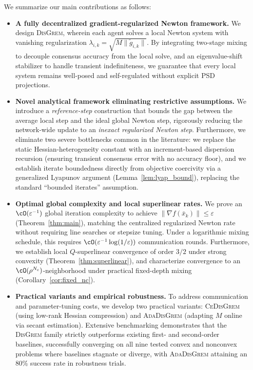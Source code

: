 \documentclass[review,onefignum,onetabnum]{siamart171218}
\begin{document}
We summarize our main contributions as follows:
\begin{itemize}[leftmargin=1.5em]
	\item \textbf{A fully decentralized gradient-regularized Newton framework.} We design \textsc{DisGrem}, wherein each agent solves a local Newton system with vanishing regularization $\lambda_{i,k}=\sqrt{M\|\tilde g_{i,k}\|}$. By integrating two-stage mixing to decouple consensus accuracy from the local solve, and an eigenvalue-shift stabilizer to handle transient indefiniteness, we guarantee that every local system remains well-posed and self-regulated without explicit PSD projections.
	
	\item \textbf{Novel analytical framework eliminating restrictive assumptions.} We introduce a \emph{reference-step} construction that bounds the gap between the average local step and the ideal global Newton step, rigorously reducing the network-wide update to an \emph{inexact regularized Newton step}. Furthermore, we eliminate two severe bottlenecks common in the literature: we replace the static Hessian-heterogeneity constant with an increment-based dispersion recursion (ensuring transient consensus error with no accuracy floor), and we establish iterate boundedness directly from objective coercivity via a generalized Lyapunov argument (Lemma~\ref{lem:lyap_bound}), replacing the standard ``bounded iterates'' assumption.
	
	\item \textbf{Optimal global complexity and local superlinear rates.} We prove an $\cO(\varepsilon^{-1})$ global iteration complexity to achieve $\|\nabla f(\bar x_k)\|\le\varepsilon$ (Theorem~\ref{thm:main}), matching the centralized regularized Newton rate without requiring line searches or stepsize tuning. Under a logarithmic mixing schedule, this requires $\cO(\varepsilon^{-1}\log(1/\varepsilon))$ communication rounds. Furthermore, we establish local $Q$-superlinear convergence of order $3/2$ under strong convexity (Theorem~\ref{thm:superlinear}), and characterize convergence to an $\cO(\rho^{N_c})$-neighborhood under practical fixed-depth mixing (Corollary~\ref{cor:fixed_nc}).
	
	\item \textbf{Practical variants and empirical robustness.} To address communication and parameter-tuning costs, we develop two practical variants: \textsc{CeDisGrem} (using low-rank Hessian compression) and \textsc{AdaDisGrem} (adapting $M$ online via secant estimation). Extensive benchmarking demonstrates that the \textsc{DisGrem} family strictly outperforms existing first- and second-order baselines, successfully converging on all nine tested convex and nonconvex problems where baselines stagnate or diverge, with \textsc{AdaDisGrem} attaining an 80\% success rate in robustness trials.
\end{itemize}
\end{document}
